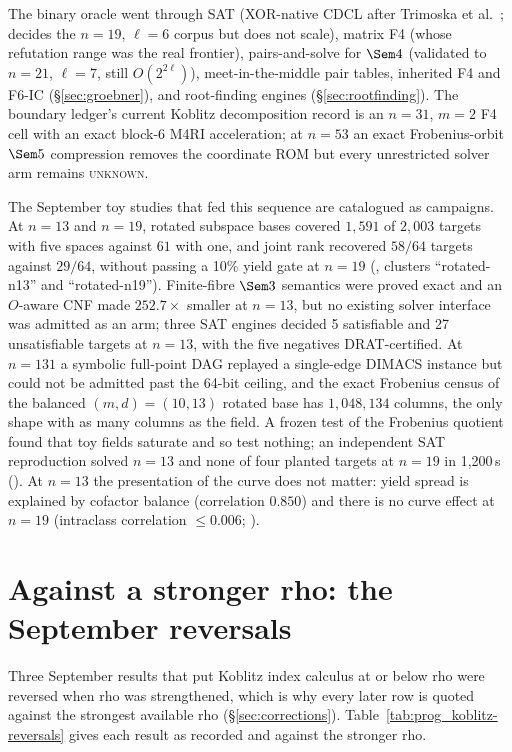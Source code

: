 The binary oracle went through SAT (XOR-native CDCL after Trimoska et
al.~\cite{trimoska2020}; decides the $n=19$, $\ell=6$ corpus but does not
scale), matrix F4 (whose refutation range was the real frontier),
pairs-and-solve for $\Sem4$ (validated to $n=21$, $\ell=7$, still
$O(2^{2\ell})$), meet-in-the-middle pair tables, inherited F4 and F6-IC
(\S\ref{sec:groebner}), and root-finding engines (\S\ref{sec:rootfinding}).
The boundary ledger's current Koblitz decomposition record is an $n=31$,
$m=2$ F4 cell with an exact block-6 M4RI acceleration; at $n=53$ an exact
Frobenius-orbit $\Sem5$ compression removes the coordinate ROM but every
unrestricted solver arm remains \textsc{unknown}.

The September toy studies that fed this sequence are catalogued as
campaigns. At $n=13$ and $n=19$, rotated subspace bases covered $1{,}591$ of
$2{,}003$ targets with five spaces against $61$ with one, and joint rank
recovered $58/64$ targets against $29/64$, without passing a 10\% yield
gate at $n=19$ (, clusters
``rotated-n13'' and ``rotated-n19''). Finite-fibre $\Sem3$ semantics were
proved exact and an $O$-aware CNF made $252.7\times$ smaller at $n=13$, but
no existing solver interface was admitted as an arm; three SAT engines
decided 5 satisfiable and 27 unsatisfiable targets at $n=13$, with the five
negatives DRAT-certified. At $n=131$ a symbolic full-point DAG replayed a
single-edge DIMACS instance but could not be admitted past the 64-bit
ceiling, and the exact Frobenius census of the balanced $(m,d)=(10,13)$
rotated base has $1{,}048{,}134$ columns, the only shape with as many columns
as the field. A frozen test of the Frobenius quotient found that toy fields
saturate and so test nothing; an independent SAT reproduction solved
$n=13$ and none of four planted targets at $n=19$ in 1{,}200\,s
(). At $n=13$ the
presentation of the curve does not matter: yield spread is explained by
cofactor balance (correlation $0.850$) and there is no curve effect at
$n=19$ (intraclass correlation $\le0.006$;
).

\section{Against a stronger rho: the September reversals}\label{sec:koblitz-strong}

Three September results that put Koblitz index calculus at or below rho
were reversed when rho was strengthened, which is why every later row is
quoted against the strongest available rho
(\S\ref{sec:corrections}). Table~\ref{tab:prog_koblitz-reversals} gives
each result as recorded and against the stronger rho.

